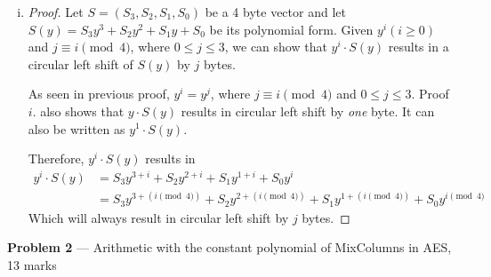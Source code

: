 \documentclass[11pt]{article}
\theoremstyle{definition}
\begin{document}
\begin{enumerate}[a.]
\begin{enumerate}[i. ]
\begin{proof}
          By deriving $j$ from $i = 4k + j$, we get:
          \begin{align*}
            i &= 4k + j \\
            j &= i - 4k \\
            j &= i \pmod{4}
          \end{align*}

          Therefore,
          \begin{align*}
            y^i &= y^{4k + j} \\
                &= y^{4k} \cdot y^{j} \\
                &= (y^{4})^k \cdot y^j \\
                &= y^j
          \end{align*}
          Note that, $y^4 = 1$ and $j \equiv i \pmod{4}$ with $0 \leq j \leq 3$.
        \end{proof}

      \item
        \begin{proof}
          Let $S = (S_3, S_2, S_1, S_0)$ be a 4 byte vector and let $S(y) = S_3y^3 + S_2y^2 + S_1y + S_0$ be its polynomial form. Given $y^i (i \geq 0)$ and $j \equiv i \pmod{4}$, where $0 \leq j \leq 3$, we can show that $y^i \cdot S(y)$ results in a circular left shift of $S(y)$ by $j$ bytes.

          As seen in previous proof, $y^i = y^j$, where $j \equiv i \pmod{4}$ and $0 \leq j \leq 3$. Proof $i.$ also shows that $y \cdot S(y)$ results in circular left shift by \textit{one} byte. It can also be written as $y^1 \cdot S(y)$.

          Therefore, $y^i \cdot S(y)$ results in
          \begin{align*}
            y^i \cdot S(y) &= S_3y^{3 + i} + S_2y^{2 + i} + S_1y^{1 + i} + S_0y^i \\
                           &= S_3y^{3 + (i \pmod{4})} + S_2y^{2 + (i \pmod{4})} + S_1y^{1 + (i \pmod{4})} + S_0y^{i \pmod{4}}
          \end{align*}
          Which will always result in circular left shift by $j$ bytes.
        \end{proof}
    \end{enumerate}
\end{enumerate}

\newpage

\item[] \textbf{Problem 2} --- Arithmetic with the constant polynomial of MixColumns in AES, 13 marks
\end{document}
